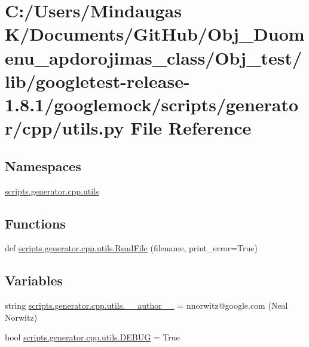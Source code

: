 \hypertarget{_obj__test_2lib_2googletest-release-1_88_81_2googlemock_2scripts_2generator_2cpp_2utils_8py}{}\section{C\+:/\+Users/\+Mindaugas K/\+Documents/\+Git\+Hub/\+Obj\+\_\+\+Duomenu\+\_\+apdorojimas\+\_\+class/\+Obj\+\_\+test/lib/googletest-\/release-\/1.8.1/googlemock/scripts/generator/cpp/utils.py File Reference}
\label{_obj__test_2lib_2googletest-release-1_88_81_2googlemock_2scripts_2generator_2cpp_2utils_8py}
\subsection*{Namespaces}
\begin{DoxyCompactItemize}
\item 
 \mbox{\hyperlink{namespacescripts_1_1generator_1_1cpp_1_1utils}{scripts.\+generator.\+cpp.\+utils}}
\end{DoxyCompactItemize}
\subsection*{Functions}
\begin{DoxyCompactItemize}
\item 
def \mbox{\hyperlink{namespacescripts_1_1generator_1_1cpp_1_1utils_a49971a3ac031487a5e151f2e74be871a}{scripts.\+generator.\+cpp.\+utils.\+Read\+File}} (filename, print\+\_\+error=True)
\end{DoxyCompactItemize}
\subsection*{Variables}
\begin{DoxyCompactItemize}
\item 
string \mbox{\hyperlink{namespacescripts_1_1generator_1_1cpp_1_1utils_a89132687936f756356e554b1b05fa03c}{scripts.\+generator.\+cpp.\+utils.\+\_\+\+\_\+author\+\_\+\+\_\+}} = \textquotesingle{}nnorwitz@google.\+com (Neal Norwitz)\textquotesingle{}
\item 
bool \mbox{\hyperlink{namespacescripts_1_1generator_1_1cpp_1_1utils_a91edd7d6c42148905da0644123cdd721}{scripts.\+generator.\+cpp.\+utils.\+D\+E\+B\+UG}} = True
\end{DoxyCompactItemize}
